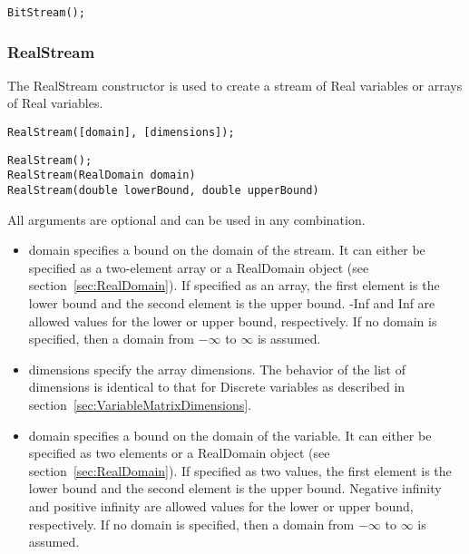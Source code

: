 \ifjava
\begin{lstlisting}
BitStream();
\end{lstlisting}
\fi

\subsubsection{RealStream}


The RealStream constructor is used to create a stream of Real variables or arrays of Real variables.

\ifmatlab
\begin{lstlisting}
RealStream([domain], [dimensions]);
\end{lstlisting}
\fi

\ifjava
\begin{lstlisting}
RealStream();
RealStream(RealDomain domain)
RealStream(double lowerBound, double upperBound)
\end{lstlisting}
\fi

\ifmatlab
All arguments are optional and can be used in any combination.

\begin{itemize}
\item domain specifies a bound on the domain of the stream. It can either be specified as a two-element array or a RealDomain object (see section~\ref{sec:RealDomain}).  If specified as an array, the first element is the lower bound and the second element is the upper bound. -Inf and Inf are allowed values for the lower or upper bound, respectively.  If no domain is specified, then a domain from $-\infty$ to $\infty$ is assumed.
\item dimensions specify the array dimensions.  The behavior of the list of dimensions is identical to that for Discrete variables as described in section~\ref{sec:VariableMatrixDimensions}.
\end{itemize}
\fi

\ifjava
\begin{itemize}
\item domain specifies a bound on the domain of the variable. It can either be specified as two elements or a RealDomain object (see section~\ref{sec:RealDomain}).  If specified as two values, the first element is the lower bound and the second element is the upper bound. Negative infinity and positive infinity are allowed values for the lower or upper bound, respectively.  If no domain is specified, then a domain from $-\infty$ to $\infty$ is assumed.
\end{itemize}
\fi



